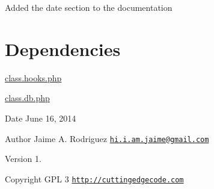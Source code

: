 \begin{DoxyItemize}
\item Added the date section to the documentation
\end{DoxyItemize}\hypertarget{ip2country_dependencies}{}\section{Dependencies}\label{ip2country_dependencies}

\begin{DoxyItemize}
\item \hyperlink{class_8hooks_8php}{class.\-hooks.\-php}
\item \hyperlink{class_8db_8php}{class.\-db.\-php}
\end{DoxyItemize}

\begin{DoxyDate}{Date}
June 16, 2014 
\end{DoxyDate}
\begin{DoxyAuthor}{Author}
Jaime A. Rodriguez \href{mailto:hi.i.am.jaime@gmail.com}{\tt hi.\-i.\-am.\-jaime@gmail.\-com} 
\end{DoxyAuthor}
\begin{DoxyVersion}{Version}
1. 
\end{DoxyVersion}
\begin{DoxyCopyright}{Copyright}
G\-P\-L 3 \href{http://cuttingedgecode.com}{\tt http\-://cuttingedgecode.\-com} 
\end{DoxyCopyright}

